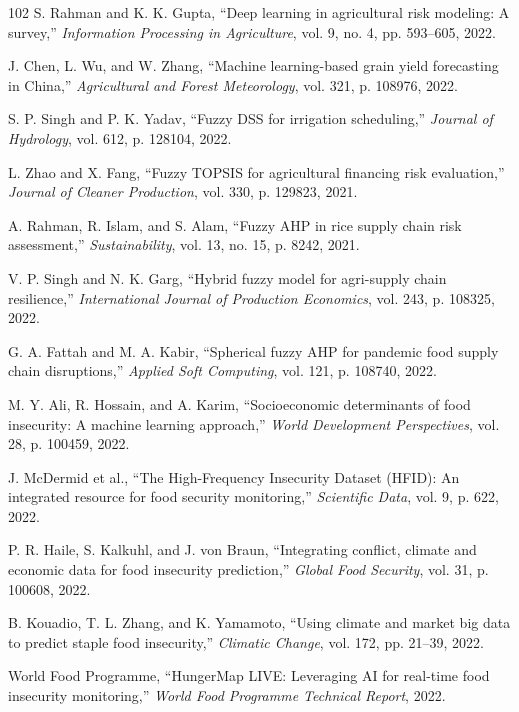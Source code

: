 \documentclass[preprint,12pt]{elsarticle}
\begin{document}
\begin{thebibliography}{102}
		S. Rahman and K. K. Gupta, ``Deep learning in agricultural risk modeling: A survey,'' \emph{Information Processing in Agriculture}, vol. 9, no. 4, pp. 593--605, 2022.
		
		J. Chen, L. Wu, and W. Zhang, ``Machine learning-based grain yield forecasting in China,'' \emph{Agricultural and Forest Meteorology}, vol. 321, p. 108976, 2022.
		
		S. P. Singh and P. K. Yadav, ``Fuzzy DSS for irrigation scheduling,'' \emph{Journal of Hydrology}, vol. 612, p. 128104, 2022.
		
		L. Zhao and X. Fang, ``Fuzzy TOPSIS for agricultural financing risk evaluation,'' \emph{Journal of Cleaner Production}, vol. 330, p. 129823, 2021.
		
		A. Rahman, R. Islam, and S. Alam, ``Fuzzy AHP in rice supply chain risk assessment,'' \emph{Sustainability}, vol. 13, no. 15, p. 8242, 2021.
		
		V. P. Singh and N. K. Garg, ``Hybrid fuzzy model for agri-supply chain resilience,'' \emph{International Journal of Production Economics}, vol. 243, p. 108325, 2022.
		
		G. A. Fattah and M. A. Kabir, ``Spherical fuzzy AHP for pandemic food supply chain disruptions,'' \emph{Applied Soft Computing}, vol. 121, p. 108740, 2022.
		
		M. Y. Ali, R. Hossain, and A. Karim, ``Socioeconomic determinants of food insecurity: A machine learning approach,'' \emph{World Development Perspectives}, vol. 28, p. 100459, 2022.
		
		J. McDermid et al., ``The High-Frequency Insecurity Dataset (HFID): An integrated resource for food security monitoring,'' \emph{Scientific Data}, vol. 9, p. 622, 2022.
		
		P. R. Haile, S. Kalkuhl, and J. von Braun, ``Integrating conflict, climate and economic data for food insecurity prediction,'' \emph{Global Food Security}, vol. 31, p. 100608, 2022.
		
		B. Kouadio, T. L. Zhang, and K. Yamamoto, ``Using climate and market big data to predict staple food insecurity,'' \emph{Climatic Change}, vol. 172, pp. 21--39, 2022.
		
		World Food Programme, ``HungerMap LIVE: Leveraging AI for real-time food insecurity monitoring,'' \emph{World Food Programme Technical Report}, 2022.
		

\end{thebibliography}
\end{document}
